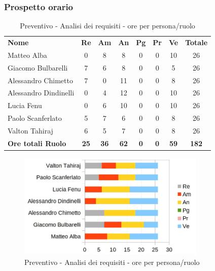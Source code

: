 	\subsubsection{Prospetto orario}
			
		\begin{table} [h!]
			\begin{center}
				\begin{tabular} { m{3.5cm} c c c c c c c }
					\rowcolor{lightgray}
					\textbf{Nome} & \textbf{Re} & \textbf{Am} & \textbf{An} & \textbf{Pg} & \textbf{Pr} & \textbf{Ve} & \textbf{Totale} \\
					Matteo Alba &0 & 8 & 8 &0 & 0& 10 & 26\\
					Giacomo Bulbarelli & 7 & 6 & 8 & 0& 0& 5 & 26 \\
					Alessandro Chimetto & 7 &0 & 11 &0 & 0& 8 & 26 \\
					Alessandro Dindinelli &0 & 4 & 12 &0 & 0& 10 & 26 \\
					Lucia Fenu &0 & 6 & 10 &0 & 0& 10 & 26 \\
					Paolo Scanferlato & 5 & 7 & 6 & 0& 0& 8 & 26 \\
					Valton Tahiraj & 6 & 5 & 7 &0 & 0& 8 & 26 \\
					\textbf{Ore totali Ruolo} & \textbf{25} & \textbf{36} & \textbf{62} & \textbf{0} & \textbf{0}& \textbf{59} & \textbf{182}
				\end{tabular}
				\caption{Preventivo - Analisi dei requisiti - ore per persona/ruolo}
			\end{center}
		\end{table}

		\begin{figure} [h!]
			\centering
			\includegraphics[width=0.8\textwidth]{res/img/grafici/analisi_dei_requisiti_ore_ruolo.jpg}
			\caption{Preventivo - Analisi dei requisiti - ore per persona/ruolo} 
		\end{figure}

